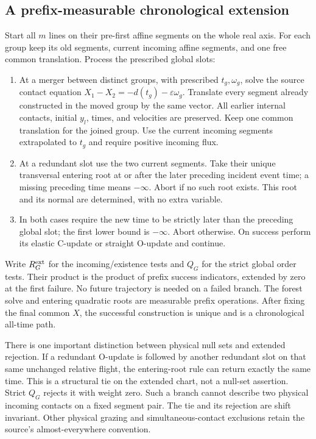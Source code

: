 \documentclass[11pt]{article}
\newcommand{\eps}{\varepsilon}
\theoremstyle{definition}\newtheorem{definition}[theorem]{Definition}
\theoremstyle{remark}\newtheorem{remark}[theorem]{Remark}
\numberwithin{equation}{section}
\begin{document}
\subsection{A prefix-measurable chronological extension}\label{subsec:prefix}
Start all $m$ lines on their pre-first affine segments on the whole real
axis. For each group keep its old segments, current incoming affine segments,
and one free common translation. Process the prescribed global slots:
\begin{enumerate}
\item At a merger between distinct groups, with prescribed $t_g,\omega_g$,
 solve the source contact equation
 $X_1-X_2=-d(t_g)-\eps\omega_g$. Translate every segment already constructed
 in the moved group by the same vector. All earlier internal contacts,
 initial $y_l$, times, and velocities are preserved. Keep one common
 translation for the joined group. Use the current incoming segments
 extrapolated to $t_g$ and require positive incoming flux.
\item At a redundant slot use the two current segments. Take their unique
 transversal entering root at or after the later preceding incident event
 time; a missing preceding time means $-\infty$. Abort if no such root
 exists. This root and its normal are determined, with no extra variable.
\item In both cases require the new time to be strictly later than the
 preceding global slot; the first lower bound is $-\infty$. Abort otherwise.
 On success perform its elastic C-update or straight O-update and continue.
\end{enumerate}
Write $R_G^{\rm ext}$ for the incoming/existence tests and $Q_G$ for the
strict global order tests. Their product is the product of prefix success
indicators, extended by zero at the first failure. No future trajectory is
needed on a failed branch. The forest solve and entering quadratic roots
are measurable prefix operations. After fixing the final common $X$, the
successful construction is unique and is a chronological all-time path.

There is one important distinction between physical null sets and extended
rejection. If a redundant O-update is followed by another redundant slot
on that same unchanged relative flight, the entering-root rule can return
exactly the same time. This is a structural tie on the extended chart, not
a null-set assertion. Strict $Q_G$ rejects it with weight zero. Such a
branch cannot describe two physical incoming contacts on a fixed segment
pair. The tie and its rejection are shift invariant. Other physical
grazing and simultaneous-contact exclusions retain the source's
almost-everywhere convention.
\end{document}
